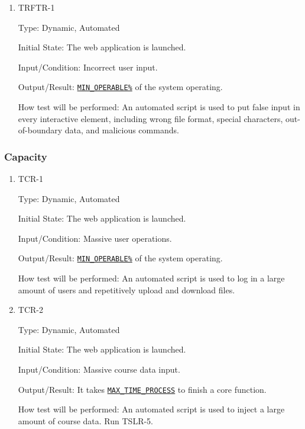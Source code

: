 \documentclass[12pt, titlepage]{article}
\begin{document}
\begin{enumerate}
\item{TRFTR-1\\}\label{TRFTR-1}

Type: Dynamic, Automated
					
Initial State: The web application is launched.
					
Input/Condition: Incorrect user input.
					
Output/Result: \hyperref[MIN_OPERABLE]{\texttt{MIN\_OPERABLE\%}} of the system operating.
					
How test will be performed: An automated script is used to put false input in every interactive element, including wrong file format, special characters, out-of-boundary data, and malicious commands.
\end{enumerate}
\subsubsection{Capacity}

\begin{enumerate}
\item{TCR-1\\}\label{TCR-1}

Type: Dynamic, Automated
					
Initial State: The web application is launched.
					
Input/Condition: Massive user operations.
					
Output/Result: \hyperref[MIN_OPERABLE]{\texttt{MIN\_OPERABLE\%}} of the system operating.
					
How test will be performed: An automated script is used to log in a large amount of users and repetitively upload and download files.

\item{TCR-2\\}\label{TCR-2}

Type: Dynamic, Automated
					
Initial State: The web application is launched.
					
Input/Condition: Massive course data input.
					
Output/Result: It takes \hyperref[MAX_TIME_PROCESS]{\texttt{MAX\_TIME\_PROCESS}} to finish a core function.
					
How test will be performed: An automated script is used to inject a large amount of course data.  Run TSLR-5.

\end{enumerate}
\end{document}
